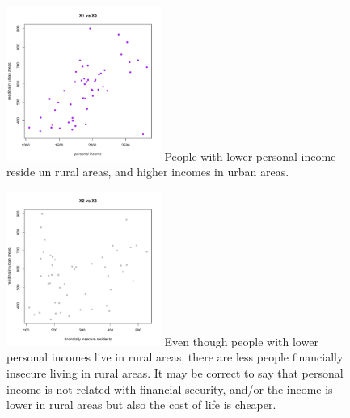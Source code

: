 \documentclass[12pt,letterpaper]{article}
\begin{document}
	\begin{figure}[ht]
	\centering
	\includegraphics[width=0.45\textwidth]{plot_example5.pdf}
	\center
			People with lower personal income reside un rural areas, and higher incomes in urban areas.
	\end{figure}



	\begin{figure}[ht]
	\centering
	\includegraphics[width=0.45\textwidth]{plot_example6.pdf}
	\center
			Even though people with lower personal incomes live in rural areas, there are less people financially insecure living in rural areas. It may be correct to say that personal income is not related with financial security, and/or the income is lower in rural areas but also the cost of life is cheaper.
	\end{figure}


\clearpage
\end{document}
